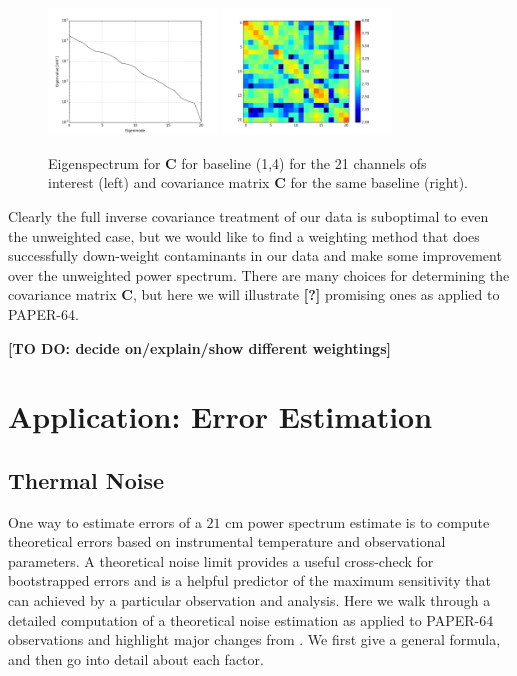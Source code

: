 \documentclass[preprint2,numberedappendix,tighten,twocolappendix]{aastex6}  %
\newcommand{\cc}[1]{{\color{purple} \textbf{[#1]}}}
\begin{document}
\begin{figure}
	\centering
	\includegraphics[width=0.4\textwidth]{plots/eigenspectrum.png}
	\includegraphics[width=0.4\textwidth]{plots/covariance.png}
	\caption{Eigenspectrum for $\textbf{C}$ for baseline (1,4) for the 21 channels ofs interest (left) and covariance matrix $\textbf{C}$ for the same baseline (right).}
	\label{fig:eigenspectrum}
\end{figure}

Clearly the full inverse covariance treatment of our data is suboptimal to even the unweighted case, but we would like to find a weighting method that does successfully down-weight contaminants in our data and make some improvement over the unweighted power spectrum. There are many choices for determining the covariance matrix $\textbf{C}$, but here we will illustrate \cc{?} promising ones as applied to PAPER-64.

\cc{TO DO: decide on/explain/show different weightings}

\section{Application: Error Estimation}
\label{sec:Error}

\subsection{Thermal Noise}
\label{sec:PSSense}

One way to estimate errors of a $21$ cm power spectrum estimate is to compute theoretical errors based on instrumental temperature and observational parameters. A theoretical noise limit provides a useful cross-check for bootstrapped errors and is a helpful predictor of the maximum sensitivity that can achieved by a particular observation and analysis. Here we walk through a detailed computation of a theoretical noise estimation as applied to PAPER-64 observations and highlight major changes from \citet{ali_et_al2015}. We first give a general formula, and then go into detail about each factor.
\end{document}
